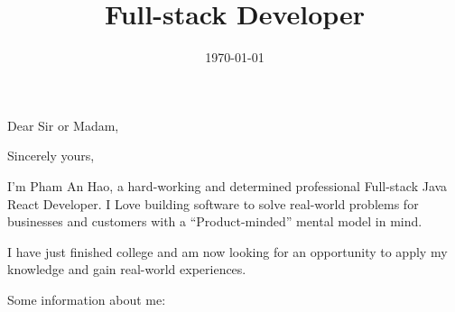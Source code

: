 \documentclass[11pt,a4paper,sans]{moderncv}        %
\title{Full-stack Developer}
\begin{document}
\clearpage

\date{\today}
\opening{Dear Sir or Madam,}
\closing{Sincerely yours,}
\makelettertitle

I'm Pham An Hao, a hard-working and determined professional Full-stack Java React Developer. I Love building software to solve real-world problems for businesses and customers with a ``Product-minded'' mental model in mind.



I have just finished college and am now looking for an opportunity to apply my knowledge and gain real-world experiences.

Some information about me:

\end{document}
